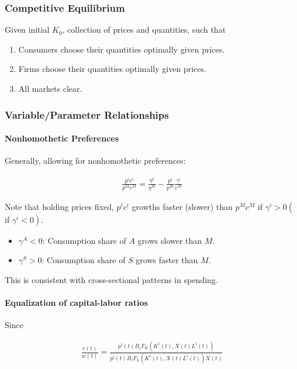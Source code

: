 \documentclass[10pt]{article}
\begin{document}
\subsubsection{Competitive Equilibrium}

Given initial $K_0$, collection of prices and quantities, such that
\begin{enumerate}
    \item Consumers choose their quantities optimally given prices.
    \item Firms choose their quantities optimally given prices.
    \item All markets clear.
\end{enumerate}



\subsubsection{Variable/Parameter Relationships}

\paragraph{Nonhomothetic Preferences}

Generally, allowing for nonhomothetic preferences:

\begin{align}
    \frac{p^i c^i}{p^M c^M}=\frac{\eta^i}{\eta^M}-\frac{p^i}{p^M} \frac{\gamma^i}{c^M}
\end{align}

Note that holding prices fixed, $p^i c^i$ growths faster (slower) than $p^M c^M$ if $\gamma^i>0\left(\right.$ if $\left.\gamma^i<0\right)$.

\begin{itemize}
    \item $\gamma^A < 0$: Consumption share of $A$ grows slower than $M$.
    \item $\gamma^S > 0$: Consumption share of $S$ grows faster than $M$.
\end{itemize}

This is consistent with cross-sectional patterns in spending.

\paragraph{Equalization of capital-labor ratios}

Since 

\begin{align}
    \frac{r(t)}{w(t)} = \frac{p^i(t) B_i F_K\left(K^i(t), X(t) L^i(t)\right)}{p^i(t) B_i F_L\left(K^i(t), X(t) L^i(t)\right) X(t)}
\end{align}
\end{document}
